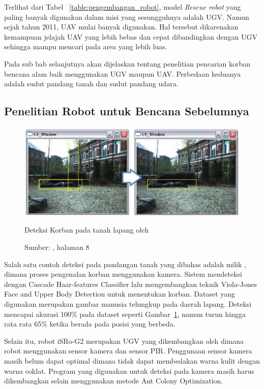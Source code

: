 Terlihat dari Tabel ~\ref{table:pengembangan_robot}, model \textit{Rescue robot} yang paling banyak digunakan dalam misi yang sesungguhnya adalah UGV. Namun sejak tahun 2011, UAV mulai banyak digunakan. Hal tersebut dikarenakan kemampuan jelajah UAV yang lebih bebas dan cepat dibandingkan dengan UGV sehingga mampu mencari pada area yang lebih luas.

Pada sub bab selanjutnya akan dijelaskan tentang penelitian pencarian korban bencana alam baik menggunakan UGV maupun UAV. Perbedaan keduanya adalah sudut pandang tanah dan sudut pandang udara.

\subsection{Penelitian Robot untuk Bencana Sebelumnya}
\begin{figure}[ht]
 \includegraphics[width=\textwidth]{Decuber}
 \caption{Deteksi Korban pada tanah lapang oleh \cite{de2009human}}
  \caption*{Sumber: \citet{de2009human}, halaman 8}
 \label{fig:deteksidecuber}   
\end{figure}

Salah satu contoh deteksi pada pandangan tanah yang dibahas adalah milik \citet{de2009human}, dimana proses pengenalan korban menggunakan kamera. Sistem mendeteksi dengan Cascade Haar-features Classifier lalu mengembangkan teknik Viola-Jones Face and Upper Body Detection untuk menentukan korban. Dataset yang digunakan merupakan gambar manusia telungkup pada daerah lapang. Deteksi mencapai akurasi 100\% pada dataset seperti Gambar~\ref{fig:deteksidecuber}, namun turun hingga rata rata 65\% ketika berada pada posisi yang berbeda.

Selain itu, robot iSRo-G2 merupakan UGV yang dikembangkan oleh \citet{Irawan2011isro} dimana robot menggunakan sensor kamera dan sensor PIR. Penggunaan sensor kamera masih belum dapat optimal dimana tidak dapat membedakan warna kulit dengan warna coklat. Program yang digunakan untuk deteksi pada kamera masih harus dikembangkan selain menggunakan metode Ant Colony Optimization.

